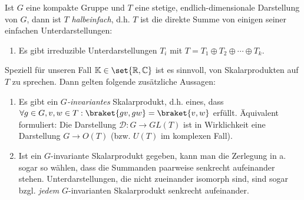 \begin{theorem}
Ist $G$ eine kompakte Gruppe und $T$ eine stetige, endlich-dimensionale Darstellung von $G$, dann ist $T$ \emph{halbeinfach}, d.h. $T$ ist die direkte Summe von einigen seiner einfachen Unterdarstellungen:
\begin{enumerate}
\item Es gibt irreduzible Unterdarstellungen $T_i$ mit $T=T_1\oplus T_2\oplus\cdots\oplus T_k$.
\end{enumerate}

Speziell für unseren Fall $\IK\in\set{\IR,\IC}$ ist es sinnvoll, von Skalarprodukten auf $T$ zu sprechen. Dann gelten folgende zusätzliche Aussagen:
\begin{enumerate}[resume]
\item Es gibt ein \emph{$G$-invariantes} Skalarprodukt, d.h. eines, dass $\forall g\in G, v,w\in T: \braket{gv,gw} = \braket{v,w}$ erfüllt. Äquivalent formuliert: Die Darstellung $\mathcal{D}: G\to GL(T)$ ist in Wirklichkeit eine Darstellung $G\to O(T)$ (bzw. $U(T)$ im komplexen Fall).
\item Ist ein $G$-invariante Skalarprodukt gegeben, kann man die Zerlegung in a. sogar so wählen, dass die Summanden paarweise senkrecht aufeinander stehen. Unterdarstellungen, die nicht zueinander isomorph sind, sind sogar bzgl. \emph{jedem} $G$-invarianten Skalarprodukt senkrecht aufeinander.
\end{enumerate}
\end{theorem}
